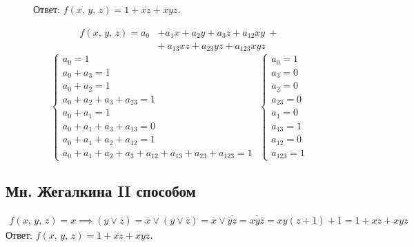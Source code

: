 \documentclass[12pt,a4paper]{article}
\theoremstyle{plain}
\theoremstyle{definition}
\theoremstyle{remark}
\numberwithin{equation}{section}
\begin{document}
\begin{figure}[H]
\begin{minipage}[t]{0.38\textwidth}
    \vspace{0.5em}
    \noindent Ответ: $f(x,\,y,\,z) = 1 + xz + xyz$.
  \end{minipage} \hfill 
  \begin{minipage}[t]{0.6\textwidth}
    \vspace{0em}
    \begin{equation*}
      \begin{aligned}
        f(x,\,y,\,z) = a_0 &+ a_1x + a_2y + a_3z + a_{12}xy \ + \\ 
                           &+ \ a_{13}xz + a_{23}yz + a_{123}xyz
      \end{aligned}
    \end{equation*}
    \begin{equation*}
      \begin{cases}
        a_0 = 1 \\
        a_0 + a_3 = 1 \\
        a_0 + a_2 = 1 \\
        a_0 + a_2 + a_3 + a_{23} = 1 \\
        a_0 + a_1 = 1 \\ 
        a_0 + a_1 + a_3 + a_{13} = 0 \\
        a_0 + a_1 + a_2 + a_{12} = 1 \\
        a_0 + a_1 + a_2 + a_3 + a_{12} + a_{13} + a_{23} + a_{123} = 1
      \end{cases} \;
      \begin{cases}
        a_0 = 1 \\
        a_3 = 0 \\
        a_2 = 0 \\
        a_{23} = 0 \\
        a_1 = 0 \\ 
        a_{13} = 1 \\
        a_{12} = 0 \\
        a_{123} = 1
      \end{cases} 
    \end{equation*}
  \end{minipage}
\end{figure}

\subsection{Мн. Жегалкина II способом}

\begin{equation*}
  \begin{aligned}
    f(x,\,y,\,z) = x \implies (y \lor \overline{z}) = \overline{x} \lor 
    (y \lor \overline z) = \overline{x} \lor \overline{\overline{y}z} = \overline{x y\overline{z}} = xy(z + 1) + 1 = 1 + xz + xyz 
  \end{aligned}
\end{equation*}
\noindent Ответ: $f(x,\,y,\,z) = 1 + xz + xyz$.
\end{document}
